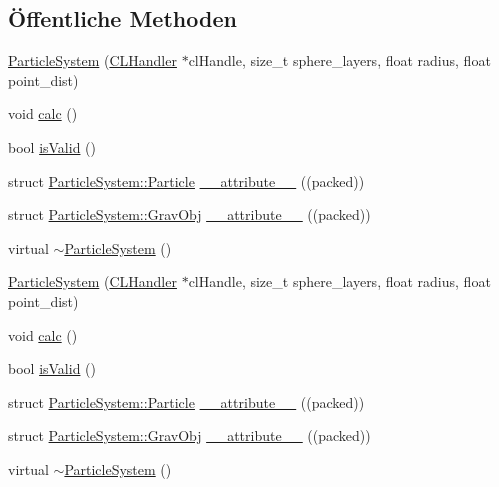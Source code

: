 \subsection*{Öffentliche Methoden}
\begin{DoxyCompactItemize}
\item 
\hyperlink{classParticleSystem_aff6f56273d7a4332b015b20abbe68ecb}{Particle\-System} (\hyperlink{classCLHandler}{C\-L\-Handler} $\ast$cl\-Handle, size\-\_\-t sphere\-\_\-layers, float radius, float point\-\_\-dist)
\item 
void \hyperlink{classParticleSystem_a6908575021b0f12f4bf4d7298acf4900}{calc} ()
\item 
bool \hyperlink{classParticleSystem_af1962b233fb096b8907b112812fc94e0}{is\-Valid} ()
\item 
struct \hyperlink{structParticleSystem_1_1Particle}{Particle\-System\-::\-Particle} \hyperlink{classParticleSystem_aa147f50c142991990d579e19de89510c}{\-\_\-\-\_\-attribute\-\_\-\-\_\-} ((packed))
\item 
struct \hyperlink{structParticleSystem_1_1GravObj}{Particle\-System\-::\-Grav\-Obj} \hyperlink{classParticleSystem_a48018f3c6fb2eb6f94b2b69552af1120}{\-\_\-\-\_\-attribute\-\_\-\-\_\-} ((packed))
\item 
virtual \hyperlink{classParticleSystem_a6bc725349a763b9d6817950cde16a93f}{$\sim$\-Particle\-System} ()
\item 
\hyperlink{classParticleSystem_aff6f56273d7a4332b015b20abbe68ecb}{Particle\-System} (\hyperlink{classCLHandler}{C\-L\-Handler} $\ast$cl\-Handle, size\-\_\-t sphere\-\_\-layers, float radius, float point\-\_\-dist)
\item 
void \hyperlink{classParticleSystem_a6908575021b0f12f4bf4d7298acf4900}{calc} ()
\item 
bool \hyperlink{classParticleSystem_af1962b233fb096b8907b112812fc94e0}{is\-Valid} ()
\item 
struct \hyperlink{structParticleSystem_1_1Particle}{Particle\-System\-::\-Particle} \hyperlink{classParticleSystem_aa147f50c142991990d579e19de89510c}{\-\_\-\-\_\-attribute\-\_\-\-\_\-} ((packed))
\item 
struct \hyperlink{structParticleSystem_1_1GravObj}{Particle\-System\-::\-Grav\-Obj} \hyperlink{classParticleSystem_a48018f3c6fb2eb6f94b2b69552af1120}{\-\_\-\-\_\-attribute\-\_\-\-\_\-} ((packed))
\item 
virtual \hyperlink{classParticleSystem_a3745e42099638f5abf9b924a81ad0d23}{$\sim$\-Particle\-System} ()
\end{DoxyCompactItemize}
